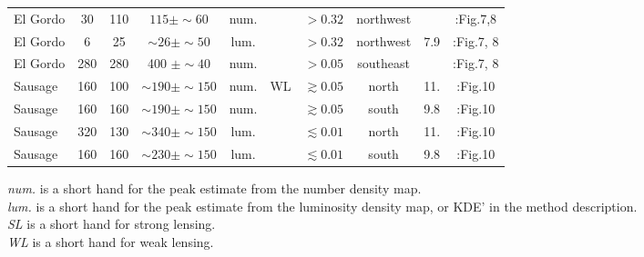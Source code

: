 \begin{table*}
\begin{tabular}{@{}lccccccccc@{}}
		El Gordo & 30 & 110 & $ 115 \pm \sim 60$ & num. & & $>0.32$ & 
		northwest&   &\citealt{Jee2014}:Fig.7,8  \\
		El Gordo & 6 & 25& $\sim 26 \pm \sim 50$ & lum. & & $>0.32$ & northwest & 7.9   
		&\citealt{Jee2014}:Fig.7, 8  \\
		El Gordo & 280 & 280 & 400 $\pm \sim 40$ & num. & & $>0.05$ &
		southeast &   &\citealt{Jee2014}:Fig.7, 8  \\
		Sausage &160 & 100& $\sim 190\pm \sim 150$ & num. & WL & $\gtrsim
		0.05$ & north & 11.  &\citealt{Jee2015}:Fig.10\\ 
		Sausage &160 & 160& $ \sim 190\pm \sim 150 $  & num. &  & $\gtrsim
		0.05$ & south & 9.8 & \citealt{Jee2015}:Fig.10\\ 

		Sausage & 320 & 130 & $\sim340 \pm \sim 150 $  & lum. & & $\lesssim
		0.01$ & north & 11. & \citealt{Jee2015}:Fig.10\\ 

		Sausage & 160 & 160 &$\sim230 \pm \sim 150 $  & lum. & & $\lesssim
		0.01$ & south & 9.8 &\citealt{Jee2015}:Fig.10\\ 
	 \hline
	 \end{tabular} 
	 \raggedright{
		 {\it num.} is a short hand for the peak estimate from the number
		 density map. \\
		 {\it lum.} is a short hand for the peak estimate from the luminosity
		 density map, or KDE' in the method description. \\
		 {\it SL} is a short hand for strong lensing. \\
		 {\it WL} is a short hand for weak lensing. \\
	 }

\end{table*}


